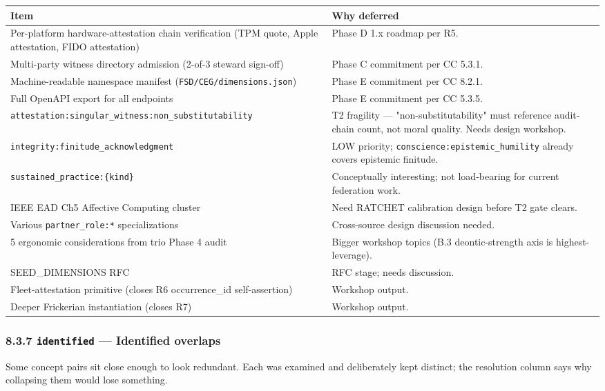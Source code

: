 \documentclass[11pt]{article}
\begin{document}
{\footnotesize
\begin{longtable}{|p{8.0cm}|p{8.0cm}|}\hline
\textbf{Item} & \textbf{Why deferred} \\ \hline\endhead
Per-platform hardware-attestation chain verification (TPM quote, Apple attestation, FIDO attestation) & Phase D 1.x roadmap per R5. \\ \hline
Multi-party witness directory admission (2-of-3 steward sign-off) & Phase C commitment per CC 5.3.1. \\ \hline
Machine-readable namespace manifest (\texttt{FSD/CEG/dimensions.json}) & Phase E commitment per CC 8.2.1. \\ \hline
Full OpenAPI export for all endpoints & Phase E commitment per CC 5.3.5. \\ \hline
\texttt{attestation:singular\_witness:non\_substitutability} & T2 fragility — "non-substitutability" must reference audit-chain count, not moral quality. Needs design workshop. \\ \hline
\texttt{integrity:finitude\_acknowledgment} & LOW priority; \texttt{conscience:epistemic\_humility} already covers epistemic finitude. \\ \hline
\texttt{sustained\_practice:\{kind\}} & Conceptually interesting; not load-bearing for current federation work. \\ \hline
IEEE EAD Ch5 Affective Computing cluster & Need RATCHET calibration design before T2 gate clears. \\ \hline
Various \texttt{partner\_role:*} specializations & Cross-source design discussion needed. \\ \hline
5 ergonomic considerations from trio Phase 4 audit & Bigger workshop topics (B.3 deontic-strength axis is highest-leverage). \\ \hline
SEED\_DIMENSIONS RFC & RFC stage; needs discussion. \\ \hline
Fleet-attestation primitive (closes R6 occurrence\_id self-assertion) & Workshop output. \\ \hline
Deeper Frickerian instantiation (closes R7) & Workshop output. \\ \hline
\end{longtable}}


\subsubsection*{8.3.7 \texttt{identified} — Identified overlaps}


Some concept pairs sit close enough to look redundant. Each was examined and deliberately kept distinct; the resolution column says why collapsing them would lose something.
\end{document}
